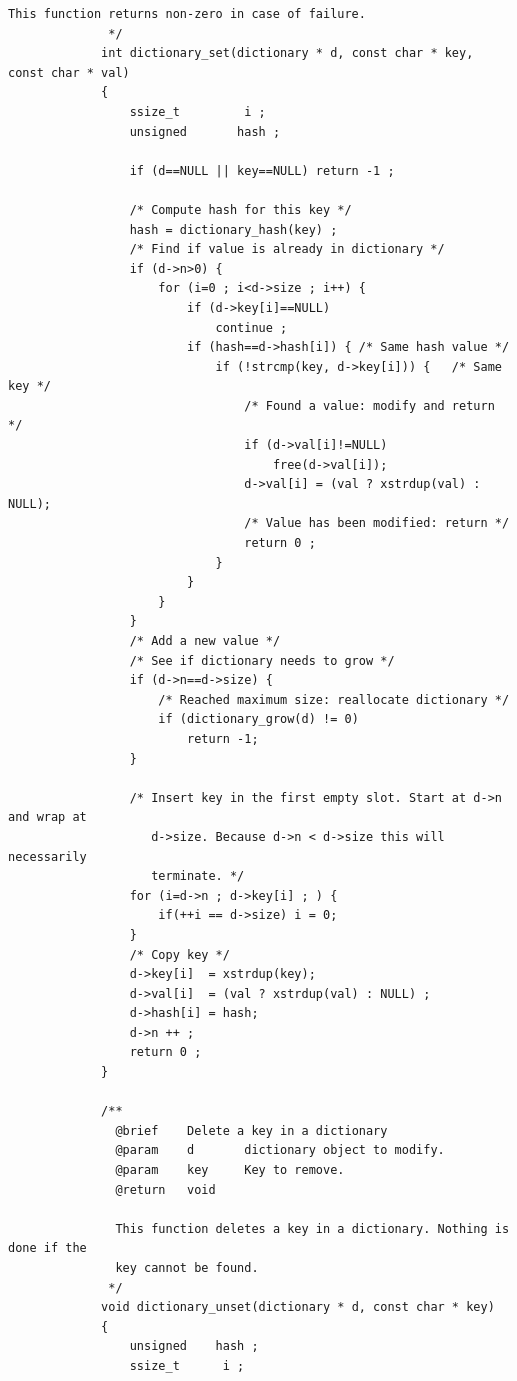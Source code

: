 \documentclass{article}
\begin{document}
\begin{Verbatim}[gobble=8]
               This function returns non-zero in case of failure.
              */
             int dictionary_set(dictionary * d, const char * key, const char * val)
             {
                 ssize_t         i ;
                 unsigned       hash ;
             
                 if (d==NULL || key==NULL) return -1 ;
             
                 /* Compute hash for this key */
                 hash = dictionary_hash(key) ;
                 /* Find if value is already in dictionary */
                 if (d->n>0) {
                     for (i=0 ; i<d->size ; i++) {
                         if (d->key[i]==NULL)
                             continue ;
                         if (hash==d->hash[i]) { /* Same hash value */
                             if (!strcmp(key, d->key[i])) {   /* Same key */
                                 /* Found a value: modify and return */
                                 if (d->val[i]!=NULL)
                                     free(d->val[i]);
                                 d->val[i] = (val ? xstrdup(val) : NULL);
                                 /* Value has been modified: return */
                                 return 0 ;
                             }
                         }
                     }
                 }
                 /* Add a new value */
                 /* See if dictionary needs to grow */
                 if (d->n==d->size) {
                     /* Reached maximum size: reallocate dictionary */
                     if (dictionary_grow(d) != 0)
                         return -1;
                 }
             
                 /* Insert key in the first empty slot. Start at d->n and wrap at
                    d->size. Because d->n < d->size this will necessarily
                    terminate. */
                 for (i=d->n ; d->key[i] ; ) {
                     if(++i == d->size) i = 0;
                 }
                 /* Copy key */
                 d->key[i]  = xstrdup(key);
                 d->val[i]  = (val ? xstrdup(val) : NULL) ;
                 d->hash[i] = hash;
                 d->n ++ ;
                 return 0 ;
             }
             
             /**
               @brief    Delete a key in a dictionary
               @param    d       dictionary object to modify.
               @param    key     Key to remove.
               @return   void
             
               This function deletes a key in a dictionary. Nothing is done if the
               key cannot be found.
              */
             void dictionary_unset(dictionary * d, const char * key)
             {
                 unsigned    hash ;
                 ssize_t      i ;
             

\end{Verbatim}
\end{document}
